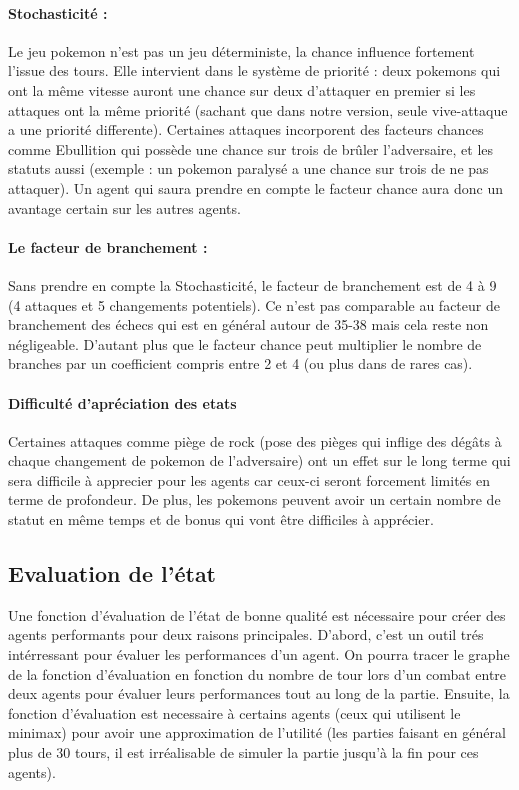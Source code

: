 			\paragraph{Stochasticité :}
				Le jeu pokemon n'est pas un jeu déterministe, la chance influence fortement l'issue des tours. Elle intervient dans le système de priorité : deux pokemons qui 				ont la 	même vitesse auront une chance sur deux d'attaquer en premier si les attaques ont la même priorité (sachant que dans notre version, seule vive-attaque 
				a une priorité differente). Certaines attaques incorporent des facteurs chances comme Ebullition qui possède une chance sur trois de brûler l'adversaire, et les 							statuts aussi (exemple : un pokemon paralysé a une chance sur trois de ne pas attaquer). Un agent qui saura prendre en compte le facteur chance aura donc un 					avantage certain sur les autres agents.
			\paragraph{Le facteur de branchement :}
			 	Sans prendre en compte la Stochasticité, le facteur de branchement est de 4 à 9 (4 attaques et 5 changements potentiels).  Ce n'est pas comparable au facteur de 						branchement des échecs qui est en général autour de 35-38 mais cela reste non négligeable. D'autant plus que le facteur chance peut multiplier le nombre de 						branches par un coefficient compris entre 2 et 4 (ou plus dans de rares cas).
			\paragraph{Difficulté d'apréciation des etats}
					Certaines attaques comme piège de rock (pose des pièges qui inflige des dégâts à chaque changement de pokemon de l'adversaire) ont un effet sur le long 							terme qui sera difficile à apprecier pour les agents car ceux-ci seront forcement limités en terme de profondeur.
					De plus, les pokemons peuvent avoir un certain nombre de statut en même temps et de bonus qui vont être difficiles à apprécier.
    \subsection{Evaluation de l'état}
		Une fonction d'évaluation de l'état de bonne qualité est nécessaire pour créer des agents performants pour deux raisons principales. D'abord, c'est un outil trés intérressant 				pour évaluer les performances d'un agent. On pourra tracer le graphe de la fonction d'évaluation en fonction du nombre de tour lors d'un combat entre deux agents pour 					évaluer leurs performances tout au long de la partie. Ensuite, la fonction d'évaluation est necessaire à certains agents (ceux qui utilisent le minimax) pour avoir une 						approximation de l'utilité (les parties faisant en général plus de 30 tours, il est irréalisable de simuler la partie jusqu'à la fin pour ces agents).


